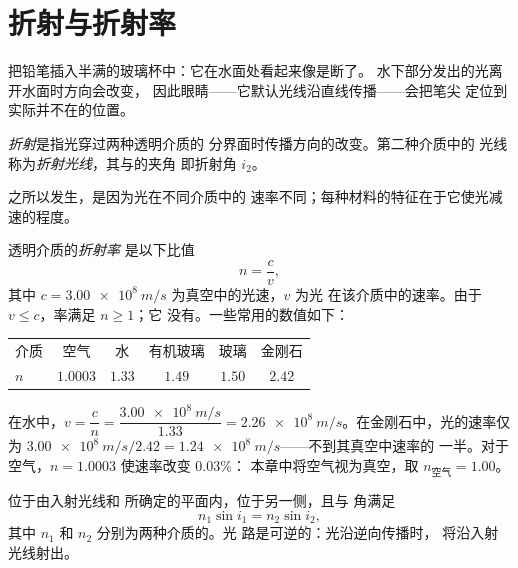\section{折射与折射率}

把铅笔插入半满的玻璃杯中：它在水面处看起来像是断了。
水下部分发出的光离开水面时方向会改变，
因此眼睛——它默认光线沿直线传播——会把笔尖
定位到实际并不在的位置。

\begin{definition}[折射]\label{def:g10:refraction:refraction}
\emph{折射}是指光穿过两种透明介质的
分界面时传播方向的改变。第二种介质中的
光线称为\emph{折射光线}，其与的夹角
即折射角 $i_2$。
\end{definition}

之所以发生，是因为光在不同介质中的
速率不同；每种材料的特征在于它使光减速的程度。

\begin{definition}[折射率]\label{def:g10:refraction:index}
透明介质的\emph{折射率}
是以下比值
\[
n = \frac{c}{v},
\]
其中 $c = \qty{3.00e8}{m/s}$ 为真空中的光速，$v$ 为光
在该介质中的速率。由于 $v \leq c$，率满足 $n \geq 1$；它
没有。一些常用的数值如下：
\begin{center}
\begin{tabular}{lccccc}
介质 & 空气 & 水 & 有机玻璃 & 玻璃 & 金刚石 \\
$n$ & $1.0003$ & $1.33$ & $1.49$ & $1.50$ & $2.42$ \\
\end{tabular}
\end{center}
\end{definition}

\begin{example}[光在水中的速率]\label{ex:g10:refraction:speed}
在水中，$v = \dfrac{c}{n} = \dfrac{\qty{3.00e8}{m/s}}{1.33}
= \qty{2.26e8}{m/s}$。在金刚石中，光的速率仅为
$\qty{3.00e8}{m/s}/2.42 = \qty{1.24e8}{m/s}$——不到其真空中速率的
一半。对于空气，$n = 1.0003$ 使速率改变 $0.03\%$：
本章中将空气视为真空，取 $n_{\text{空气}} = 1.00$。
\end{example}

\begin{theorem}[斯涅耳折射定律]\label{thm:g10:refraction:snell}
位于由入射光线和
所确定的平面内，位于另一侧，且与
角满足
\[
n_1 \sin i_1 = n_2 \sin i_2 ,
\]
其中 $n_1$ 和 $n_2$ 分别为两种介质的。光
路是可逆的：光沿逆向传播时，
将沿入射光线射出。
\end{theorem}
\admitted

